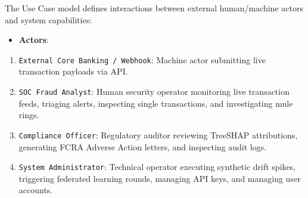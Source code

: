 \documentclass[12pt,a4paper,oneside]{report}
\begin{document}
The Use Case model defines interactions between external human/machine actors and system capabilities:

\begin{itemize}[leftmargin=0.35in]
\item \textbf{Actors}:
\end{itemize}
\begin{enumerate}[leftmargin=0.35in]
\item \texttt{External Core Banking / Webhook}: Machine actor submitting live transaction payloads via API.
\item \texttt{SOC Fraud Analyst}: Human security operator monitoring live transaction feeds, triaging alerts, inspecting single transactions, and investigating mule rings.
\item \texttt{Compliance Officer}: Regulatory auditor reviewing TreeSHAP attributions, generating FCRA Adverse Action letters, and inspecting audit logs.
\item \texttt{System Administrator}: Technical operator executing synthetic drift spikes, triggering federated learning rounds, managing API keys, and managing user accounts.
\end{enumerate}
\end{document}

